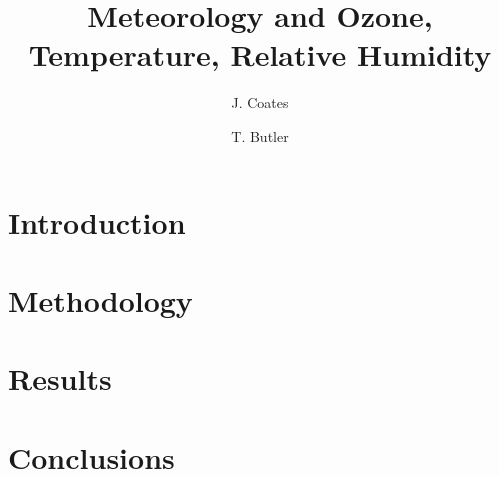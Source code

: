 \documentclass[11pt,a4paper]{article}
\title{Meteorology and Ozone, Temperature, Relative Humidity}
\author[1]{J. Coates}
\author[1]{T. Butler}
\affil[1]{Institute for Advanced Sustainability Studies, Potsdam, Germany}
\begin{document}
\maketitle

\begin{abstract}
\end{abstract}

\section{Introduction} \label{s:introduction}
%

\section{Methodology} \label{s:methodology}


\section{Results} \label{s:results}
%

\section{Conclusions} \label{s:conclusions}
%


 
\end{document}
